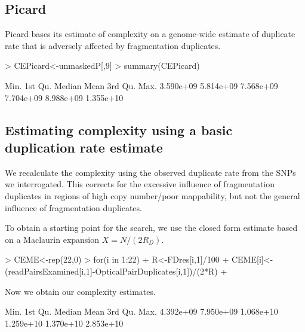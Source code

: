\documentclass{article}
\begin{document}
\subsection{Picard}

Picard bases its estimate of complexity on a genome-wide estimate of duplicate rate that is adversely affected by fragmentation duplicates.

\begin{Schunk}
\begin{Sinput}
> CEPicard<-unmaskedP[,9]
> summary(CEPicard)
\end{Sinput}
\begin{Soutput}
     Min.   1st Qu.    Median      Mean   3rd Qu.      Max. 
3.590e+09 5.814e+09 7.568e+09 7.704e+09 8.988e+09 1.355e+10 
\end{Soutput}
\end{Schunk}

\subsection{Estimating complexity using a basic duplication rate estimate}

We recalculate the complexity using the observed duplicate rate from the SNPs we interrogated. This corrects for the excessive influence of fragmentation duplicates in regions of high copy number/poor mappability, but not the general influence of fragmentation duplicates.

To obtain a starting point for the search, we use the closed form estimate based on a Maclaurin expansion $X = N/(2R_D)$.

\begin{Schunk}
\begin{Sinput}
> CEME<-rep(22,0)
> for(i in 1:22){
+   R<-FDres[i,1]/100
+   CEME[i]<-(readPairsExamined[i,1]-OpticalPairDuplicates[i,1])/(2*R)
+ }
\end{Sinput}
\end{Schunk}
 
Now we obtain our complexity estimates.

\begin{Schunk}
\begin{Soutput}
     Min.   1st Qu.    Median      Mean   3rd Qu.      Max. 
4.392e+09 7.950e+09 1.068e+10 1.259e+10 1.370e+10 2.853e+10 
\end{Soutput}
\end{Schunk}
\end{document}

